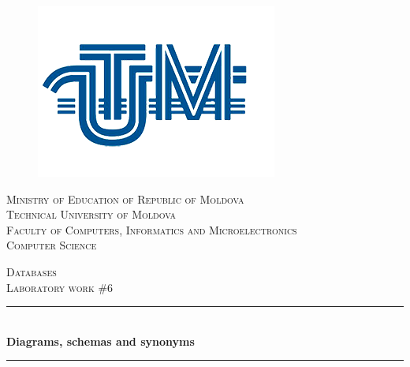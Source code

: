 \begin{titlepage}

  \begin{center} %

\begin{figure}[!h]
	\centering
	\includegraphics[scale=0.35]{logo.png}
\end{figure}

  
  \textsc{\large Ministry of Education of Republic of Moldova}\\[0.5cm]
  \textsc{\large Technical University of Moldova}\\[0.5cm]
  \textsc{\large Faculty of Computers, Informatics and Microelectronics}\\[0.5cm]
  \textsc{\large Computer Science}\\[0.5cm]
  \vspace{20 mm}

  \textsc{\Large Databases}\\[0.5cm] %
  \textsc{\large Laboratory work \#6}\\[0.5cm] %

\newcommand{\HRule}{\rule{\linewidth}{0.5mm}} %

  \vspace{5 mm}
  \HRule \\[0.4cm]
  { \LARGE \bfseries Diagrams, schemas and synonyms}\\[0.4cm] %
  \HRule \\[1.5cm]


\end{center}
\end{titlepage}
